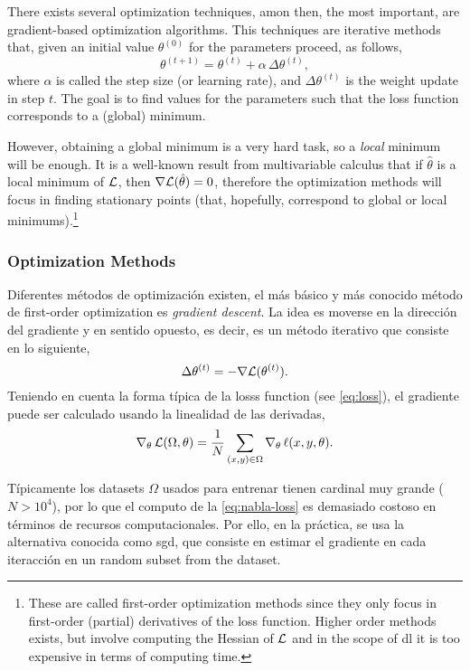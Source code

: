 There exists several optimization techniques, amon then, the most important,
are gradient-based optimization algorithms. This techniques are iterative
methods that, given an initial value \(\theta^{(0)}\) for the parameters
proceed, as follows,
\begin{equation}
  \theta^{(t + 1)} = \theta^{(t)} + \alpha\,\Delta\theta^{(t)},
\end{equation}
where \(\alpha\) is called the step size (or learning rate), and
\(\Delta\theta^{(t)}\) is the weight update in step \(t\). The goal is to find
values for the parameters such that the loss function corresponds to a (global)
minimum.

However, obtaining a global minimum is a very hard task, so a \emph{local}
minimum will be enough. It is a well-known result from multivariable calculus
that if \(\hat{\theta}\) is a local minimum of \(\mathcal{L}\), then
\(\nabla\mathcal{L}(\hat{\theta}) = 0\), therefore the optimization methods will
focus in finding stationary points (that, hopefully, correspond to global or
local minimums).\footnote{These are called first-order optimization methods
  since they only focus in first-order (partial) derivatives of the loss
  function. Higher order methods exists, but involve computing the Hessian of
  \(\mathcal{L}\) and in the scope of \gls{dl} it is too expensive in terms of
  computing time.}

\subsubsection{Optimization Methods}
Diferentes métodos de optimización existen, el más básico y más conocido método
de first-order optimization es \emph{gradient descent}. La idea es moverse en
la dirección del gradiente y en sentido opuesto, es decir, es un método
iterativo que consiste en lo siguiente,
\begin{equation} \label{eq:gd}
  \Delta\theta^{(t)} = - \nabla\mathcal{L}(\theta^{(t)}).
\end{equation}
Teniendo en cuenta la forma típica de la losss function (see \vref{eq:loss}),
el gradiente puede ser calculado usando la linealidad de las derivadas,
\begin{equation} \label{eq:nabla-loss}
  \nabla_{\theta}\,\mathcal{L}(\Omega, \theta) =
  \frac{1}{N} \sum_{(x, y) \in \Omega} \nabla_{\theta}\,\ell (x, y, \theta).
\end{equation}

Típicamente los datasets \(\Omega\) usados para entrenar tienen cardinal muy
grande (\(N > 10^4\)), por lo que el computo de la \vref{eq:nabla-loss} es
demasiado costoso en términos de recursos computacionales. Por ello, en la
práctica, se usa la alternativa conocida como \gls{sgd}, que consiste en
estimar el gradiente en cada iteracción en un random subset from the dataset.


